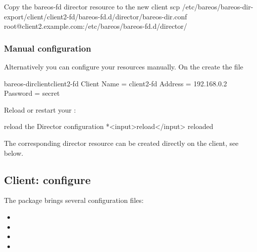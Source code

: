 \begin{commands}{Copy the bareos-fd director resource to the new client}
scp /etc/bareos/bareos-dir-export/client/client2-fd/bareos-fd.d/director/bareos-dir.conf root@client2.example.com:/etc/bareos/bareos-fd.d/director/
\end{commands}

\subsubsection*{Manual configuration}

Alternatively you can configure your resources manually.
On the \bareosDir create the file
\begin{bareosConfigResource}{bareos-dir}{client}{client2-fd}
Client {
  Name = client2-fd
  Address = 192.168.0.2
  Password = secret
}
\end{bareosConfigResource}

Reload or restart your \bareosDir:
\begin{bconsole}{reload the Director configuration}
*<input>reload</input>
reloaded
\end{bconsole}

The corresponding \bareosFd director resource can be created directly on the client, see below.


\subsection*{Client: configure}

The package   brings several configuration files:
\begin{itemize}
    \item {}
    \item {}
    \item {}
    \item {}
\end{itemize}

